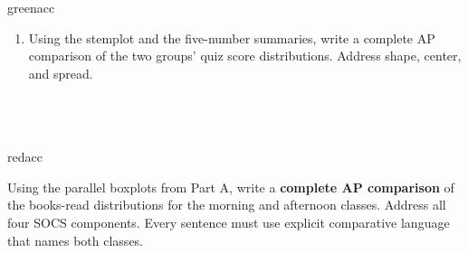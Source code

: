 \documentclass[10pt]{article}
\begin{document}
\begin{blurbbox}{greenacc}
\begin{enumerate}[leftmargin=1.5em, itemsep=8pt]
  \item Using the stemplot and the five-number summaries, write a complete
        AP comparison of the two groups' quiz score distributions.
        Address shape, center, and spread.\\[5pt]
        \writeline\\[1pt]\writeline\\[1pt]\writeline\\[1pt]\writeline

\end{enumerate}

\end{blurbbox}

\vspace{0.12in}

\boxguard
\begin{blurbbox}{redacc}
\small

Using the parallel boxplots from Part A, write a \textbf{complete AP comparison}
of the books-read distributions for the morning and afternoon classes. Address
all four SOCS components. Every sentence must use explicit comparative language
that names both classes.

\vspace{0.08in}
\writeline\\[1pt]\writeline\\[1pt]\writeline\\[1pt]
\writeline\\[1pt]\writeline\\[1pt]\writeline

\end{blurbbox}
\end{document}
